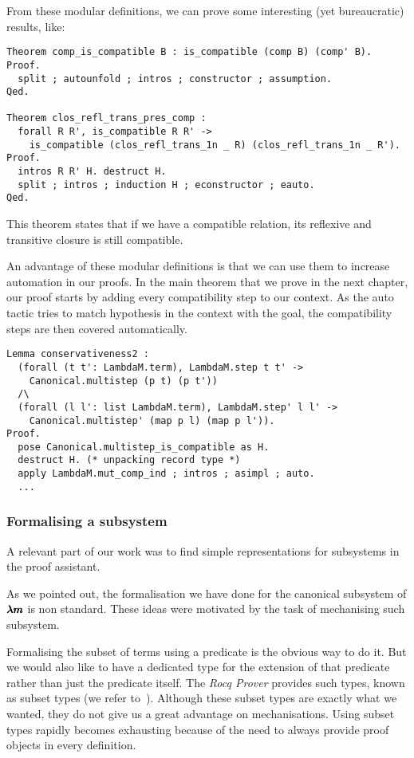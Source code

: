 From these modular definitions, we can prove some interesting (yet bureaucratic) results, like:

\begin{lstlisting}[language=Coq]
Theorem comp_is_compatible B : is_compatible (comp B) (comp' B).
Proof.
  split ; autounfold ; intros ; constructor ; assumption.
Qed.

Theorem clos_refl_trans_pres_comp :
  forall R R', is_compatible R R' ->
    is_compatible (clos_refl_trans_1n _ R) (clos_refl_trans_1n _ R').
Proof.
  intros R R' H. destruct H. 
  split ; intros ; induction H ; econstructor ; eauto.
Qed.
\end{lstlisting}

This theorem states that if we have a compatible relation, its reflexive and transitive closure is still compatible.

An advantage of these modular definitions is that we can use them to increase automation in our proofs.
In the main theorem that we prove in the next chapter, our proof starts by adding every compatibility step to our context.
As the auto tactic tries to match hypothesis in the context with the goal, the compatibility steps are then covered automatically.

\begin{lstlisting}[language=Coq]
Lemma conservativeness2 :
  (forall (t t': LambdaM.term), LambdaM.step t t' ->
    Canonical.multistep (p t) (p t'))
  /\
  (forall (l l': list LambdaM.term), LambdaM.step' l l' ->
    Canonical.multistep' (map p l) (map p l')).
Proof.
  pose Canonical.multistep_is_compatible as H.
  destruct H. (* unpacking record type *)
  apply LambdaM.mut_comp_ind ; intros ; asimpl ; auto.
  ...
\end{lstlisting}



\subsubsection{Formalising a subsystem}

A relevant part of our work was to find simple representations for subsystems in the proof assistant.

As we pointed out, the formalisation we have done for the canonical subsystem of $\pmb{\lambda m}$ is non standard.
These ideas were motivated by the task of mechanising such subsystem.

Formalising the subset of terms using a predicate is the obvious way to do it.
But we would also like to have a dedicated type for the extension of that predicate rather than just the predicate itself.
The \textit{Rocq Prover} provides such types, known as subset types (we refer to~\cite[Chapter~9.1]{CoqArt}).
Although these subset types are exactly what we wanted, they do not give us a great advantage on mechanisations.
Using subset types rapidly becomes exhausting because of the need to always provide proof objects in every definition.

